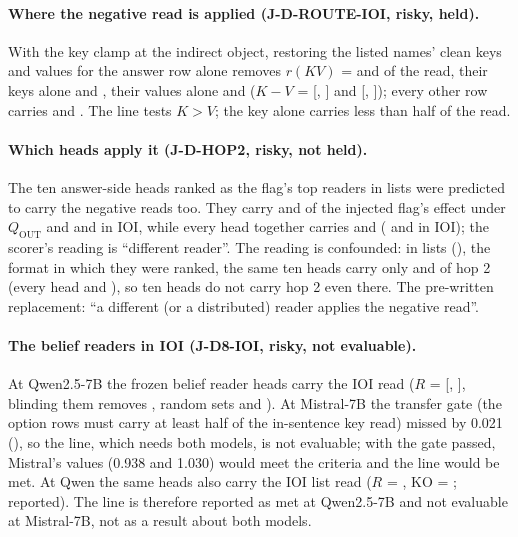 \paragraph{Where the negative read is applied (J-D-ROUTE-IOI, risky, held).} With the key clamp at the indirect object, restoring the listed names' clean keys and values for the answer row alone removes $r(KV)$ = \JdRouteKVQwenSeven{} and \JdRouteKVMistralSeven{} of the read, their keys alone \JdRouteKQwenSeven{} and \JdRouteKMistralSeven{}, their values alone \JdRouteVQwenSeven{} and \JdRouteVMistralSeven{} ($K - V$ = \JdRouteKmVQwenSeven{} [\JdRouteKmVQwenSevenLo{}, \JdRouteKmVQwenSevenHi{}] and \JdRouteKmVMistralSeven{} [\JdRouteKmVMistralSevenLo{}, \JdRouteKmVMistralSevenHi{}]); every other row carries \JdRouteOtherQwenSeven{} and \JdRouteOtherMistralSeven{}. The line tests $K > V$; the key alone carries less than half of the read.

\paragraph{Which heads apply it (J-D-HOP2, risky, not held).} The ten answer-side heads ranked as the flag's top readers in lists were predicted to carry the negative reads too. They carry \JdHopTwoQoutCarryQwenSeven{} and \JdHopTwoQoutCarryMistralSeven{} of the injected flag's effect under $Q_{\mathrm{OUT}}$ and \JdHopTwoInlineCarryQwenSeven{} and \JdHopTwoInlineCarryMistralSeven{} in IOI, while every head together carries \JdHopTwoQoutAllQwenSeven{} and \JdHopTwoQoutAllMistralSeven{} (\JdHopTwoInlineAllQwenSeven{} and \JdHopTwoInlineAllMistralSeven{} in IOI); the scorer's reading is ``different reader''. The reading is confounded: in lists (\fmtOpt{}), the format in which they were ranked, the same ten heads carry only \JdHopOptTopQwenSeven{} and \JdHopOptTopMistralSeven{} of hop 2 (every head \JdHopOptAllQwenSeven{} and \JdHopOptAllMistralSeven{}), so ten heads do not carry hop 2 even there. The pre-written replacement: ``a different (or a distributed) reader applies the negative read''.

\paragraph{The belief readers in IOI (J-D8-IOI, risky, not evaluable).} At Qwen2.5-7B the frozen belief reader heads carry the IOI read ($R$ = \JdEightIoiRQwenSeven{} [\JdEightIoiRQwenSevenLo{}, \JdEightIoiRQwenSevenHi{}], blinding them removes \JdEightIoiKOQwenSeven{}, random sets \JdEightIoiRrandQwenSeven{} and \JdEightIoiKOrandQwenSeven{}). At Mistral-7B the transfer gate (the option rows must carry at least half of the in-sentence key read) missed by 0.021 (\JdGfourRatioInlineMistralSeven{}), so the line, which needs both models, is not evaluable; with the gate passed, Mistral's values (0.938 and 1.030) would meet the criteria and the line would be met. At Qwen the same heads also carry the IOI list read ($R$ = \JdCellAfterRQwenSeven{}, KO = \JdCellAfterKOQwenSeven{}; reported). The line is therefore reported as met at Qwen2.5-7B and not evaluable at Mistral-7B, not as a result about both models. %

